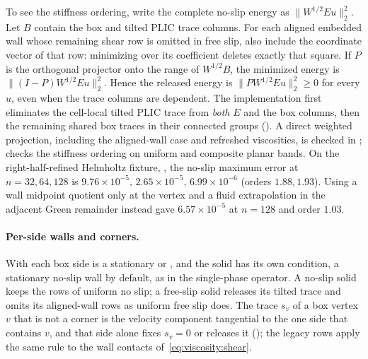 To see the stiffness ordering, write the complete no-slip energy as
$\|W^{1/2}Eu\|_2^2$. Let $B$ contain the box and tilted PLIC trace
columns. For each aligned embedded wall whose remaining shear row is
omitted in free slip, also include the coordinate vector of that row:
minimizing over its coefficient deletes exactly that square. If $P$ is the
orthogonal projector onto the range of $W^{1/2}B$, the minimized energy is
$\|(I-P)W^{1/2}Eu\|_2^2$. Hence the released energy is
$\|PW^{1/2}Eu\|_2^2\ge0$ for every $u$, even when the trace columns are
dependent. The implementation first eliminates the cell-local tilted
PLIC trace from \emph{both} $E$ and the box columns, then the remaining
shared box traces in their connected groups
().
A direct weighted projection,
including the aligned-wall case and refreshed viscosities, is checked in
;
checks the stiffness ordering on uniform and composite planar bands.
On the right-half-refined Helmholtz fixture,
,
the no-slip maximum error at $n=32,64,128$ is
$9.76\times10^{-5},\,2.65\times10^{-5},\,6.99\times10^{-6}$
(orders $1.88,1.93$). Using a wall midpoint quotient only at the vertex
and a fluid extrapolation in the adjacent Green remainder instead gave
$6.57\times10^{-5}$ at $n=128$ and order $1.03$.

\paragraph{Per-side walls and corners.}\label{sec:viscosity:per-side}
With  each box side is a stationary
\code{()} or \code{()}, and the solid has
its own  condition, a stationary no-slip wall by default, as in
the single-phase operator. A no-slip solid keeps the rows of uniform no slip;
a free-slip solid releases its tilted trace and omits its aligned-wall rows
as uniform free slip does.
The trace $s_v$ of a box vertex $v$ that is not a corner is the velocity
component tangential to the one side that contains $v$, and that side alone
fixes $s_v=0$ or releases it
();
the legacy rows apply the same rule to the wall contacts
of~\cref{eq:viscosity:shear}.


